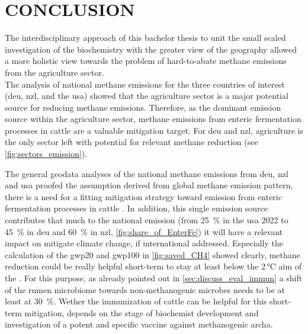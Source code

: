 \section{CONCLUSION}\label{sec:conclusion}  
The interdisciplinary approach of this bachelor thesis to unit the small scaled investigation of the biochemistry with the greater view of the geography allowed a more holistic view towards the problem of hard-to-abate methane emissions from the agriculture sector. \\

The analysis of national methane emissions for the three countries of interest (\acrshort{deu}, \acrshort{nzl}, and the \acrshort{usa}) showed that the agriculture sector is a major potential source for reducing methane emissions. Therefore, as the dominant emission source within the agriculture sector, methane emissions from enteric fermentation processes in cattle are a valuable mitigation target. For \acrshort{deu} and \acrshort{nzl}, agriculture is the only sector left with potential for relevant methane reduction (see \cref{fig:sectors_emission}).

The general geodata analyses of the national methane emissions from \acrshort{deu}, \acrshort{nzl} and \acrshort{usa} proofed the assumption derived from global methane emission pattern, there is a need for a fitting mitigation strategy toward  emission from enteric fermentation processes in cattle \parencite{appelhansUnterschatztesTreibhausgasMethan2025, saunoisGlobalMethaneBudget2025, IPPCC_AR6_Chapter7_GWP}. In addition, this single emission source contributes that much to the national emission (from 25~\% in the \acrshort{usa} 2022 to 45~\% in \acrshort{deu} and 60~\% in \acrshort{nzl}, \cref{fig:share_of_EnterFe}) it will have a relevant impact on mitigate climate change, if international addressed. Especially the calculation of the \acrshort{gwp}20 and \acrshort{gwp}100 in \cref{fig:saved_CH4} showed clearly, methane reduction could be really helpful short-term to stay at least below the 2\,°C aim of the \textcite{unfcccParisAgreement2015}. For this purpose, as already pointed out in \cref{sec:discuss_eval_immun} a shift of the rumen microbiome towards non-methanogenic microbes needs to be at least at 30~\%.
Wether the immunization of cattle can be helpful for this short-term mitigation, depends on the stage of biochemist development and investigation of a potent and specific vaccine against methanogenic \gls{archa}.

